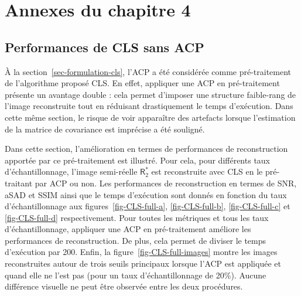 \chapter{Annexes du chapitre 4}\label{annexe-3}
\dochaptoc

\section{Performances de CLS sans ACP}\label{sec-perfs-without-acp}

\`A la section~\ref{sec-formulation-cls}, l'ACP a été considérée comme pré-traitement de l'algorithme proposé CLS. En effet, appliquer une ACP en pré-traitement présente un avantage double : cela permet d'imposer une structure faible-rang de l'image reconstruite tout en réduisant drastiquement le temps d'exécution. Dans cette même section, le risque de voir apparaître des artefacts lorsque l'estimation de la matrice de covariance est imprécise a été souligné.

Dans cette section, l'amélioration en termes de performances de reconstruction apportée par ce pré-traitement est illustré. Pour cela, pour différents taux d'échantillonnage, l'image semi-réelle $\mathsf{R}_2^*$ est reconstruite avec CLS en le pré-traitant par ACP ou non.
%
Les performances de reconstruction en termes de SNR, aSAD et SSIM ainsi que le temps d'exécution sont donnés en fonction du taux d'échantillonnage aux figures~\ref{fig-CLS-full-a}, \ref{fig-CLS-full-b}, \ref{fig-CLS-full-c} et \ref{fig-CLS-full-d} respectivement. Pour toutes les métriques et tous les taux d'échantillonnage, appliquer une ACP en pré-traitement améliore les performances de reconstruction. De plus, cela permet de diviser le temps d'exécution par 200. Enfin, la figure~\ref{fig-CLS-full-images} montre les images reconstruites autour de trois seuils principaux lorsque l'ACP est appliquée et quand elle ne l'est pas (pour un taux d'échantillonnage de 20\%). Aucune différence visuelle ne peut être observée entre les deux procédures.
 
